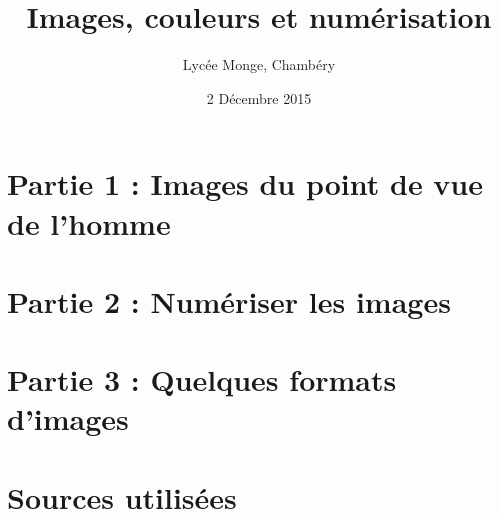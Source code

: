 \documentclass{beamer}
\begin{document}

\title{Images, couleurs et numérisation} 
\author{Lycée Monge, Chambéry} 
\date{2 Décembre 2015 \\ \bigskip {\tiny \doclicenseThis}} 



\frame{\titlepage} 

\setcounter{tocdepth}{1}



\section{Partie 1 : Images du point de vue de l'homme}  


          

\section{Partie 2 : Numériser les images}  


          

\section{Partie 3 : Quelques formats d'images}  




\section{Sources utilisées}  
\end{document}
